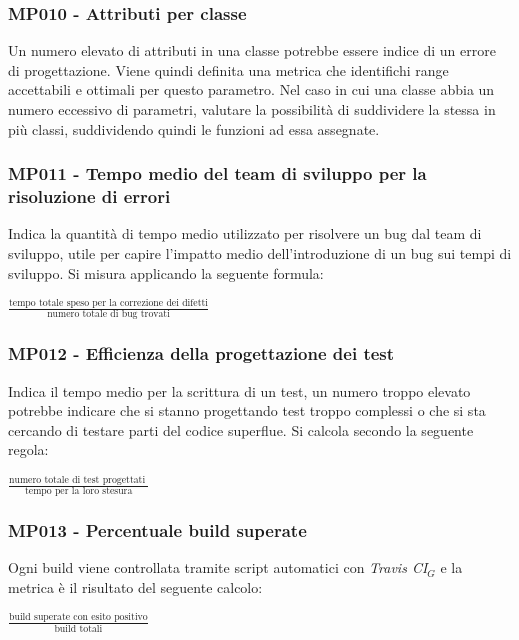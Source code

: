 \subsubsection{MP010 - Attributi per classe}
Un numero elevato di attributi in una classe potrebbe essere indice di un errore di progettazione.
Viene quindi definita una metrica che identifichi range accettabili e ottimali per questo parametro.
Nel caso in cui una classe abbia un numero eccessivo di parametri, valutare la possibilità di suddividere la stessa in più classi, suddividendo quindi le funzioni ad essa assegnate.

\subsubsection{MP011 - Tempo medio del team di sviluppo per la risoluzione di errori}
Indica la quantità di tempo medio utilizzato per risolvere un bug dal team di sviluppo, utile per capire l'impatto medio dell'introduzione di un bug sui tempi di sviluppo. Si misura applicando la seguente formula:
\begin{center}
	\vspace{1em}
	$\frac{\mbox{tempo totale speso per la correzione dei difetti}}{\mbox{numero totale di bug trovati}}$
\end{center}


\subsubsection{MP012 - Efficienza della progettazione dei test}
Indica il tempo medio per la scrittura di un test, un numero troppo elevato potrebbe indicare che si stanno progettando test troppo complessi o che si sta cercando di testare  parti del codice superflue. Si calcola secondo la seguente regola:
\begin{center}
	\vspace{1em}
	$\frac{\mbox{numero totale di test progettati }}{\mbox{tempo per la loro stesura}}$\\
\end{center}


\subsubsection{MP013 - Percentuale build superate}
Ogni build viene controllata tramite script automatici con \textit{Travis CI$_{G}$} e la metrica è il risultato del seguente calcolo:
\begin{center}
	$\frac{\mbox{build superate con esito positivo}}{\mbox{build totali}}$
\end{center}


